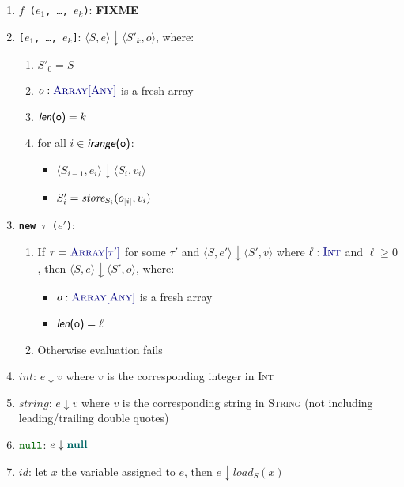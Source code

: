 \documentclass{article}
\newcommand{\tuple}[1]{\ensuremath{\langle #1 \rangle}}
\newcommand{\terminal}[1]{\textit{#1}}
\newcommand{\vterminal}[1]{\textsf{\textcolor{dgreen}{\texttt{#1}}}}
\newcommand{\Ty}[1]{\textcolor{dblue}{#1}}
\newcommand{\Ckw}[1]{{\textsf{\textbf{#1}}}}
\newcommand{\TString}{\Ty{\textsc{String}}}
\newcommand{\TInt}{\Ty{\textsc{Int}}}
\newcommand{\TAny}{\Ty{\textsc{Any}}}
\newcommand{\TArrayof}[1]{\Ty{\textsc{Array}[#1]}}
\newcommand{\Vnull}[0]{\textbf{\textcolor{dcyan}{null}}}
\newcommand{\arraylength}[1]{\textsf{\textit{len}(#1)}}
\newcommand{\arrayindices}[1]{\textsf{\textit{irange}(#1)}}
\newcommand{\failure}{\textcolor{dred}{failure}}
\newcommand{\fail}{\textcolor{dred}{fail}}
\newcommand{\arrsub}[2]{#1_{\textcolor{gray}{[}#2\textcolor{gray}{]}}}
\begin{document}
\begin{enumerate}
\begin{enumerate}
\begin{itemize}
      \item If not $v : \TInt$: \failure
      \item If not $v \in \arrayindices{$a$}$: \failure
      \item Otherwise, $\tuple{S, e} \downarrow {S_2, \textit{load}_{S_2}(\arrsub{a}{v})}$
    \end{itemize}
  \item \vterminal{$f$ ($e_1$, \ldots, $e_k$)}: \textbf{FIXME}
  \item \vterminal{[$e_1$, \ldots, $e_k$]}: $\tuple{S,e} \downarrow \tuple{S'_k,o}$, where:
    \begin{enumerate}
      \item $S'_0 = S$
      \item $o : \TArrayof{\TAny}$ is a fresh array
      \item $\arraylength{o} = k$
      \item for all $i \in \arrayindices{o}$:
        \begin{itemize}
          \item $\tuple{S_{i-1},e_i} \downarrow \tuple{S_i, v_i}$
          \item $S'_i = \textit{store}_{S_i}(\arrsub{o}{i}, v_i)$
        \end{itemize}
    \end{enumerate}
  \item \vterminal{\Ckw{new} $\tau$ ($e'$)}:
    \begin{enumerate}
    \item If $\tau = \TArrayof{\tau'}$ for some $\tau'$ and $\tuple{S,e'} \downarrow \tuple{S',v}$ where $\ell : \TInt$ and $\ell \ge 0$, then $\tuple{S,e} \downarrow \tuple{S',o}$, where:
      \begin{itemize}
      \item $o : \TArrayof{\TAny}$ is a fresh array
      \item $\arraylength{o} = \ell$
      \end{itemize}
    \item Otherwise evaluation \fail{}s
    \end{enumerate}
  \item $\terminal{int}$:  $e \downarrow v$ where $v$ is the corresponding integer in \TInt
  \item $\terminal{string}$: $e \downarrow v$ where $v$ is the corresponding string in \TString{} (not including leading/trailing double quotes)
  \item $\vterminal{null}$: $e \downarrow \Vnull$
  \item $\terminal{id}$: let $x$ the variable assigned to $e$, then $e \downarrow \textit{load}_S(x)$
  \end{enumerate}
\end{enumerate}
\end{document}
